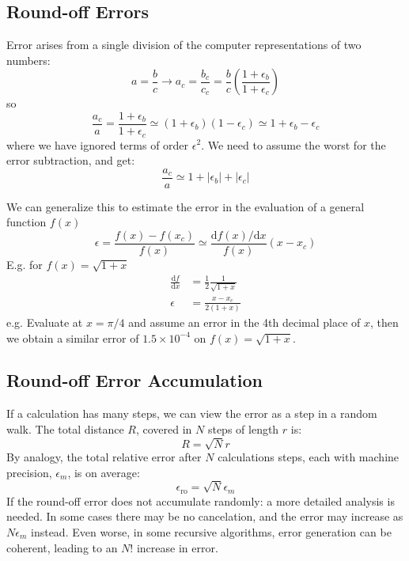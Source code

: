 \documentclass[../../../main.tex]{subfiles}
\begin{document}
\subsection{Round-off Errors} 
Error arises from a single division of the computer representations of two numbers:
\begin{equation*}
    a = \frac{b}{c} \rightarrow a_c = \frac{b_c}{c_c} = \frac{b}{c} \left( \frac{1+\epsilon_b}{1+\epsilon_c} \right)
\end{equation*}
so
\begin{equation*}
    \frac{a_c}{a} = \frac{1+\epsilon_b}{1+\epsilon_c} \simeq (1+\epsilon_b) (1- \epsilon_c) \simeq 1 + \epsilon_b - \epsilon_c
\end{equation*}
where we have ignored terms of order $\epsilon^2$. 
We need to assume the worst for the error subtraction, and get:
\begin{equation*}
    \frac{a_c}{a} \simeq 1 + |\epsilon_b| + |\epsilon_c|
\end{equation*}

We can generalize this to estimate the error in the evaluation of a general function $f(x)$
\begin{equation*}
    \epsilon = \frac{ f(x) - f(x_c) } { f(x) } \simeq \frac{\mathrm{d} f(x) / \mathrm{d}x}{f(x)} (x-x_c)
\end{equation*}
E.g. for $f(x) = \sqrt{1+x}$
\begin{align*}
    \frac{ \mathrm{d} f}{\mathrm{d}x} &= \frac{1}{2} \frac{1}{\sqrt{1+x}}\\ 
    \epsilon &= \frac{x - x_c}{2 (1+x) }
\end{align*}
e.g. Evaluate at $x=\pi/4$ and assume an error in the 4th decimal place of $x$, then we obtain a similar error of $1.5\times 10^{-4}$ on $f(x) = \sqrt{1+x}$. 

\subsection{Round-off Error Accumulation}
If a calculation has many steps, we can view the error as a step in a random walk. 
The total distance $R$, covered in $N$ steps of length $r$ is:
\begin{equation*}
    R = \sqrt{N} r
\end{equation*}
By analogy, the total relative error after $N$ calculations steps, each with machine precision, $\epsilon_m$, is on average:
\begin{equation*}
    \epsilon_\mathrm{ro} = \sqrt{N} \epsilon_m
\end{equation*}
If the round-off error does not accumulate randomly: a more detailed analysis is needed. 
In some cases there may be no cancelation, and the error may increase as $N \epsilon_m$ instead. 
Even worse, in some recursive algorithms, error generation can be coherent, leading to an $N!$ increase in error. 
\end{document}
